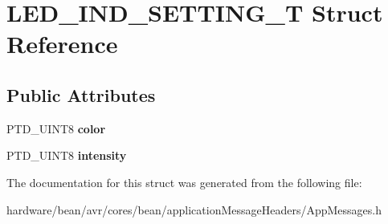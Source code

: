 \hypertarget{struct_l_e_d___i_n_d___s_e_t_t_i_n_g___t}{}\section{L\+E\+D\+\_\+\+I\+N\+D\+\_\+\+S\+E\+T\+T\+I\+N\+G\+\_\+T Struct Reference}
\label{struct_l_e_d___i_n_d___s_e_t_t_i_n_g___t}
\subsection*{Public Attributes}
\begin{DoxyCompactItemize}
\item 
P\+T\+D\+\_\+\+U\+I\+N\+T8 {\bfseries color}\hypertarget{struct_l_e_d___i_n_d___s_e_t_t_i_n_g___t_ac9fb345e99435dc6c3b82565a315659e}{}\label{struct_l_e_d___i_n_d___s_e_t_t_i_n_g___t_ac9fb345e99435dc6c3b82565a315659e}

\item 
P\+T\+D\+\_\+\+U\+I\+N\+T8 {\bfseries intensity}\hypertarget{struct_l_e_d___i_n_d___s_e_t_t_i_n_g___t_a8565652133d7ee8d97ea1f3240d78875}{}\label{struct_l_e_d___i_n_d___s_e_t_t_i_n_g___t_a8565652133d7ee8d97ea1f3240d78875}

\end{DoxyCompactItemize}


The documentation for this struct was generated from the following file\+:\begin{DoxyCompactItemize}
\item 
hardware/bean/avr/cores/bean/application\+Message\+Headers/App\+Messages.\+h\end{DoxyCompactItemize}
